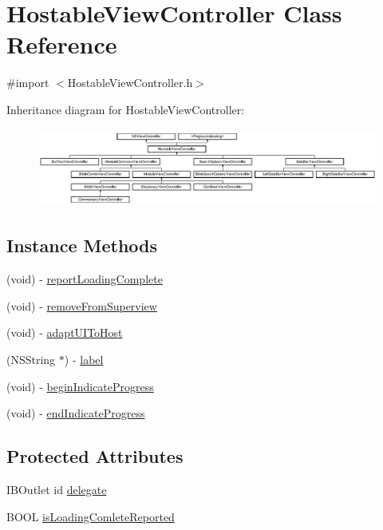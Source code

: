 \hypertarget{interface_hostable_view_controller}{\section{Hostable\-View\-Controller Class Reference}
\label{interface_hostable_view_controller}
}


{\ttfamily \#import $<$Hostable\-View\-Controller.\-h$>$}

Inheritance diagram for Hostable\-View\-Controller\-:\begin{figure}[H]
\begin{center}
\leavevmode
\includegraphics[height=2.592592cm]{interface_hostable_view_controller}
\end{center}
\end{figure}
\subsection*{Instance Methods}
\begin{DoxyCompactItemize}
\item 
(void) -\/ \hyperlink{interface_hostable_view_controller_a8a1662b9f3f94d140436f911c0ba76c1}{report\-Loading\-Complete}
\item 
(void) -\/ \hyperlink{interface_hostable_view_controller_a74ef57ab8521b78e51f6f328af6e3e1b}{remove\-From\-Superview}
\item 
(void) -\/ \hyperlink{interface_hostable_view_controller_acda22137b423344be66ad81dd4efc461}{adapt\-U\-I\-To\-Host}
\item 
(N\-S\-String $\ast$) -\/ \hyperlink{interface_hostable_view_controller_a50ff9ca7f683d08f191bf2ee41b8a8ef}{label}
\item 
(void) -\/ \hyperlink{interface_hostable_view_controller_ab140e379b24385c3f31d9fd4a5fd551c}{begin\-Indicate\-Progress}
\item 
(void) -\/ \hyperlink{interface_hostable_view_controller_aec838665fe7ae1c4e48312dc17d6ad87}{end\-Indicate\-Progress}
\end{DoxyCompactItemize}
\subsection*{Protected Attributes}
\begin{DoxyCompactItemize}
\item 
I\-B\-Outlet id \hyperlink{interface_hostable_view_controller_a9f85cc570ea673f3b6001f8509d4bb11}{delegate}
\item 
B\-O\-O\-L \hyperlink{interface_hostable_view_controller_a9ff9f2ffba33d1aa9c9bae29cc8cef1b}{is\-Loading\-Comlete\-Reported}
\end{DoxyCompactItemize}
